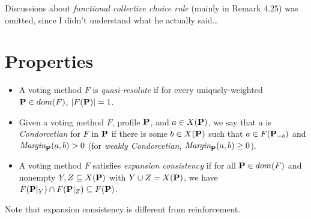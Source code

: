 Discussions about \emph{functional collective choice rule} (mainly in Remark 4.25) was omitted, since I didn't understand what he actually said\dots

\section{Properties}

\begin{definition}
    \begin{itemize}
        \item A voting method $F$ is \emph{quasi-resolute} if for every uniquely-weighted $\mathbf{P} \in dom(F)$, $|F (\mathbf{P})| = 1$.
        \item Given a voting method $F$, profile $\mathbf{P}$, and $a \in X(\mathbf{P})$, we say that $a$ is \emph{Condorcetian} for $F$ in $\mathbf{P}$ if there is some $b \in X(\mathbf{P})$ such that $a \in F(\mathbf{P}_{-b})$ and $\textit{Margin}_{\mathbf{P}}(a, b) > 0$ (for \emph{weakly Condorcetian}, $\textit{Margin}_{\mathbf{P}}(a, b) \geq 0$).
        \item A voting method $F$ satisfies \emph{expansion consistency} if for all $\mathbf{P} \in dom(F)$ and nonempty $Y, Z \subseteq X(\mathbf{P})$ with $Y \cup Z = X(\mathbf{P})$, we have $F(\mathbf{P}|_Y ) \cap F (\mathbf{P}|_Z ) \subseteq F (\mathbf{P})$.
    \end{itemize}
\end{definition}

\begin{remark}
    Note that expansion consistency is different from reinforcement.
\end{remark}

